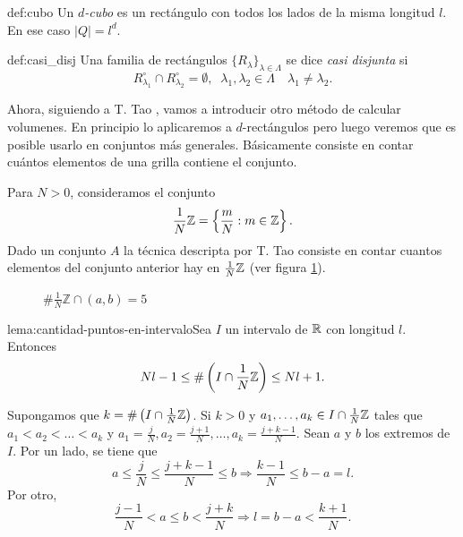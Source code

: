 \begin{definicion}{def:cubo}
    Un \emph{$d$-cubo} es un rect\'angulo con todos los lados de la misma longitud $l$. En ese caso $|Q|=l^d$.
\end{definicion}

    
\begin{definicion}{def:casi_disj}
 Una familia de rect\'angulos $\{R_{\lambda}\}_{\lambda \in \Lambda}$ se dice \emph{casi disjunta} si 
\[
R_{\lambda_1}^{\circ} \cap R_{\lambda_2}^{\circ}=\emptyset, \;\; \lambda_1,\lambda_2 \in \Lambda\quad \lambda_1\neq\lambda_2 .
\]
\end{definicion}

Ahora, siguiendo a T. Tao \cite{tao2011introduction}, vamos a introducir otro método de calcular volumenes. En principio lo aplicaremos a $d$-rectángulos pero luego veremos que es posible usarlo en conjuntos más generales. Básicamente consiste en contar cuántos elementos de una grilla contiene el conjunto.  

Para $N>0$, consideramos el conjunto 
\[
\frac{1}{N}\mathbb{Z}=\left\{ \frac{m}{N}: m\in \mathbb{Z}   \right\}.
\]
Dado un conjunto $A$ la técnica descripta por T. Tao consiste  en contar cuantos elementos del conjunto anterior hay en $\frac{1}{N}\mathbb{Z}$ (ver figura \ref{fig:grilla1}).
\begin{figure}[H]
 \begin{center}
  \def\svgwidth{12cm}

 \end{center}
 \caption{$\#\frac{1}{N}\mathbb{Z}\cap (a,b)=5$}\label{fig:grilla1}
\end{figure}


 
\begin{lema}{lema:cantidad-puntos-en-intervalo}Sea $I$ un intervalo de $\mathbb{R}$ con longitud $l$. Entonces
\[
Nl-1 \leq \# \left(I \cap \frac{1}{N}\mathbb{Z} \right) \leq Nl+1.\]
\end{lema}

\begin{demo} Supongamos que $k=\# \left(I \cap \frac{1}{N}\mathbb{Z} \right)$.  Si $k>0$ y $a_1,\ldots,a_k \in I \cap \frac{1}{N}\mathbb{Z}$ tales que 
$a_1<a_2<\ldots<a_k$ y $a_1=\frac{j}{N},a_2=\frac{j+1}{N},\ldots,a_k=\frac{j+k-1}{N}$. Sean $a$ y $b$ los extremos de $I$.  Por un lado, se tiene que
\[
a\leq \frac{j}{N}\leq \frac{j+k-1}{N}\leq b \Rightarrow
\frac{k-1}{N}\leq b-a=l.
\]
Por otro, 
\[
\frac{j-1}{N}< a\leq b<\frac{j+k}{N} \Rightarrow
l=b-a< \frac{k+1}{N}.
\]
\end{demo}

